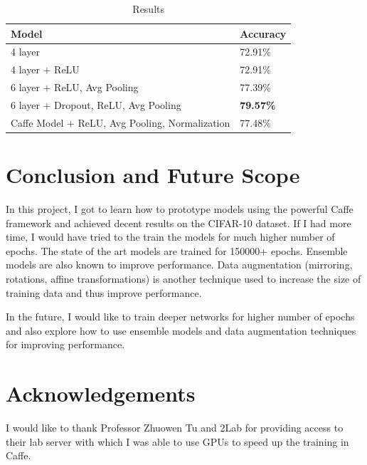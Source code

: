 \documentclass[10pt,twocolumn,letterpaper]{article}
\begin{document}
\begin{table}[h]
\begin{tabular}{|l|l|}
\hline
Model & Accuracy \\ \hline
4 layer & 72.91\%    \\ \hline
4 layer $+$ ReLU & 72.91\%    \\ \hline
6 layer $+$ ReLU, Avg Pooling & 77.39\%    \\ \hline
6 layer $+$ Dropout, ReLU, Avg Pooling & \textbf{79.57\%}    \\ \hline
Caffe Model $+$ ReLU, Avg Pooling, Normalization & 77.48\%    \\ \hline
\end{tabular}
\label{result}
\caption{Results}
\end{table}

\section{Conclusion and Future Scope}

In this project, I got to learn how to prototype models using the powerful Caffe framework and achieved decent results on the CIFAR-10 dataset. If I had more time, I would have tried to the train the models for much higher number of epochs. The state of the art models are trained for 150000+ epochs. Ensemble models are also known to improve performance. Data augmentation (mirroring, rotations, affine transformations) is another technique used to increase the size of training data and thus improve performance.

In the future, I would like to train deeper networks for higher number of epochs and also explore how to use ensemble models and data augmentation techniques for improving performance.

\section{Acknowledgements}

I would like to thank Professor Zhuowen Tu and 2Lab for providing access to their lab server with which I was able to use GPUs to speed up the training in Caffe.
\end{document}
